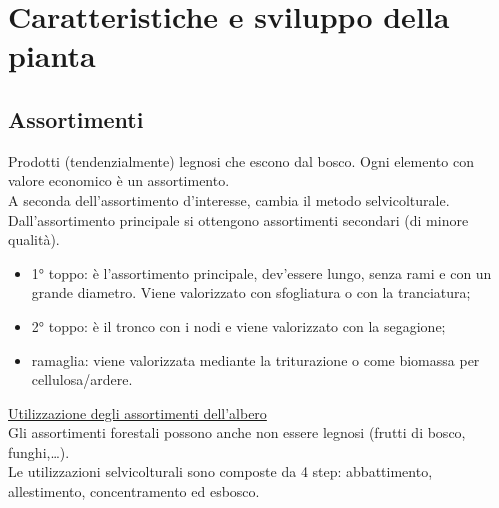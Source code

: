\documentclass{article}
\begin{document}
\section{Caratteristiche e sviluppo della pianta}
\subsection{Assortimenti}
Prodotti (tendenzialmente) legnosi che escono dal bosco. Ogni elemento con valore economico è un assortimento.\\
A seconda dell'assortimento d'interesse, cambia il metodo selvicolturale.\\
Dall'assortimento principale si ottengono assortimenti secondari (di minore qualità).
\begin{itemize}
    \item 1° toppo: è l'assortimento principale, dev'essere lungo, senza rami e con un grande diametro. Viene valorizzato con sfogliatura o con la tranciatura;
    \item 2° toppo: è il tronco con i nodi e viene valorizzato con la segagione;
    \item ramaglia: viene valorizzata mediante la triturazione o come biomassa per cellulosa/ardere.
\end{itemize}

\href{https://creafuturo.crea.gov.it/wp-content/uploads/2023/01/Figura1.jpg}{Utilizzazione degli assortimenti dell'albero}\\

Gli assortimenti forestali possono anche non essere legnosi (frutti di bosco, funghi,\dots).\\
Le utilizzazioni selvicolturali sono composte da 4 step: abbattimento, allestimento, concentramento ed esbosco.
\end{document}
